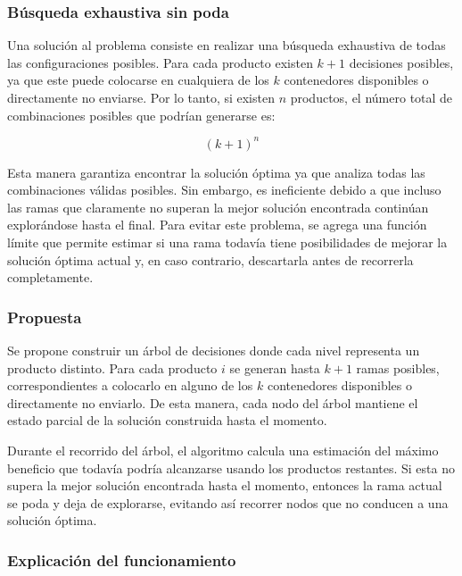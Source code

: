 \documentclass[12pt]{article}
\begin{document}
        \subsubsection{Búsqueda exhaustiva sin poda}

            Una solución al problema consiste en realizar una búsqueda exhaustiva de todas las configuraciones posibles. Para cada producto existen \(k+1\) decisiones posibles, ya que este puede colocarse en cualquiera de los \(k\) contenedores disponibles o directamente no enviarse. Por lo tanto, si existen \(n\) productos, el número total de combinaciones posibles que podrían generarse es:

            \[
            (k+1)^n
            \]

            Esta manera garantiza encontrar la solución óptima ya que analiza todas las combinaciones válidas posibles. Sin embargo, es ineficiente debido a que incluso las ramas que claramente no superan la mejor solución encontrada continúan explorándose hasta el final. Para evitar este problema, se agrega una función límite que permite estimar si una rama todavía tiene posibilidades de mejorar la solución óptima actual y, en caso contrario, descartarla antes de recorrerla completamente.

        \subsubsection{Propuesta}

            Se propone construir un árbol de decisiones donde cada nivel representa un producto distinto. Para cada producto \(i\) se generan hasta \(k+1\) ramas posibles, correspondientes a colocarlo en alguno de los \(k\) contenedores disponibles o directamente no enviarlo. De esta manera, cada nodo del árbol mantiene el estado parcial de la solución construida hasta el momento.

            Durante el recorrido del árbol, el algoritmo calcula una estimación del máximo beneficio que todavía podría alcanzarse usando los productos restantes. Si esta no supera la mejor solución encontrada hasta el momento, entonces la rama actual se poda y deja de explorarse, evitando así recorrer nodos que no conducen a una solución óptima.

        \subsubsection{Explicación del funcionamiento}
\end{document}
